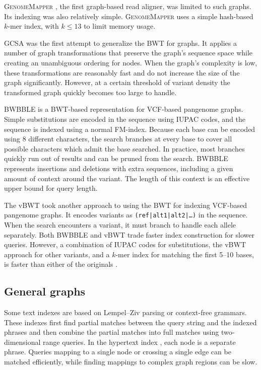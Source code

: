 \textsc{GenomeMapper} \cite{Schneeberger_2009}, the first graph-based read aligner, was limited to such graphs.
Its indexing was also relatively simple.
\textsc{GenomeMapper} uses a simple hash-based $k$-mer index, with $k \le 13$ to limit memory usage.

GCSA \cite{Siren_2014} was the first attempt to generalize the BWT for graphs.
It applies a number of graph transformations that preserve the graph's sequence space while creating an unambiguous ordering for nodes.
When the graph's complexity is low, these transformations are reasonably fast and do not increase the size of the graph significantly.
However, at a certain threshold of variant density the transformed graph quickly becomes too large to handle.

BWBBLE \cite{Huang_2013} is a BWT-based representation for VCF-based pangenome graphs.
Simple substitutions are encoded in the sequence using IUPAC codes, and the sequence is indexed using a normal FM-index.
Because each base can be encoded using 8 different characters, the search branches at every base to cover all possible characters which admit the base searched.
In practice, most branches quickly run out of results and can be pruned from the search.
BWBBLE represents insertions and deletions with extra sequences, including a given amount of context around the variant.
The length of this context is an effective upper bound for query length.

The vBWT \cite{Maciuca_2016} took another approach to using the BWT for indexing VCF-based pangenome graphs.
It encodes variants as \texttt{(ref|alt1|alt2|\dots)} in the sequence.
When the search encounters a variant, it must branch to handle each allele separately.
Both BWBBLE and vBWT trade faster index construction for slower queries.
However, a combination of IUPAC codes for substitutions, the vBWT approach for other variants, and a $k$-mer index for matching the first 5--10 bases, is faster than either of the originals \cite{Buechler_2019}.

\subsection{General graphs}

Some text indexes are based on Lempel--Ziv parsing or context-free grammars.
These indexes first find partial matches between the query string and the indexed phrases and then combine the partial matches into full matches using two-dimensional range queries.
In the hypertext index \cite{Thachuk_2013}, each node is a separate phrase.
Queries mapping to a single node or crossing a single edge can be matched efficiently, while finding mappings to complex graph regions can be slow.

